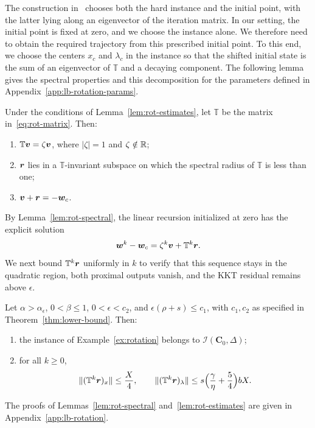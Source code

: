 The construction in~\cite[Section~5.1.1]{li2026smoothing} chooses both the
hard instance and the initial point, with the latter lying along an
eigenvector of the iteration matrix. In our setting, the initial point is
fixed at zero, and we choose the instance alone. We therefore need to
obtain the required trajectory from this prescribed initial point. To this
end, we choose the centers \(x_c\) and \(\lambda_c\) in the instance so that
the shifted initial state is the sum of an eigenvector of \(\mathbb T\)
and a decaying component. The following lemma gives the spectral
properties and this decomposition for the parameters defined
in Appendix~\ref{app:lb-rotation-params}.

\begin{lemma}
\label{lem:rot-spectral}
Under the conditions of Lemma~\ref{lem:rot-estimates}, let
\(\mathbb T\) be the matrix in~\eqref{eq:rot-matrix}. Then:
\begin{enumerate}[label=(\roman*)]
\item \(\mathbb T\bm{v}=\zeta\bm{v}\), where \(|\zeta|=1\) and \(\zeta\notin\mathbb{R}\);
\item \(\bm{r}\) lies in a \(\mathbb T\)-invariant subspace on which the spectral
  radius of \(\mathbb T\) is less than one;
\item \(\bm{v}+\bm{r}=-\bm{w}_c\).
\end{enumerate}
\end{lemma}
 
By Lemma~\ref{lem:rot-spectral}, the linear recursion initialized at zero
has the explicit solution
\[
\bm{w}^k-\bm{w}_c=\zeta^k\bm{v}+\mathbb T^k\bm{r}.
\]
We next bound \(\mathbb T^k\bm{r}\) uniformly in \(k\) to verify that this
sequence stays in the quadratic region, both proximal outputs vanish,
and the KKT residual remains above \(\epsilon\).

\begin{lemma}
\label{lem:rot-estimates}
Let \(\alpha>\alpha_\epsilon\), \(0<\beta\le1\), \(0<\epsilon<c_2\), and
\(\epsilon(\rho+s)\le c_1\), with \(c_1,c_2\) as specified in
Theorem~\ref{thm:lower-bound}. Then:
\begin{enumerate}[label=(\roman*)]
\item the instance of Example~\ref{ex:rotation} belongs to
  \(\mathcal I(\mathbf C_0,\Delta)\);
\item for all \(k\ge0\),
\[
\|(\mathbb T^k\bm{r})_x\|\le\frac X4,
\qquad
\|(\mathbb T^k\bm{r})_\lambda\|\le
s\Bigl(\frac{\gamma}{\eta}+\frac54\Bigr)bX.
\]
\end{enumerate}
\end{lemma}
The proofs of Lemmas~\ref{lem:rot-spectral} and~\ref{lem:rot-estimates} are
given in Appendix~\ref{app:lb-rotation}.

